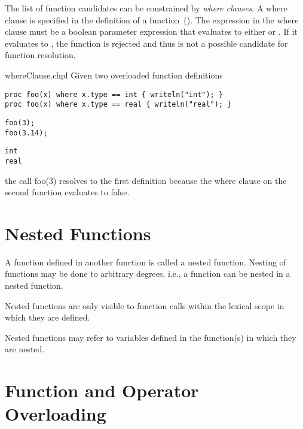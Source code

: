 The list of function candidates can be constrained by {\em where clauses}.  A
where clause is specified in the definition of a
function~().  The expression in the where clause
must be a boolean parameter expression that evaluates to either  or
. If it evaluates to , the function is rejected and
thus is not a possible candidate for function resolution.

\begin{chapelexample}{whereClause.chpl}
Given two overloaded function definitions
\begin{chapel}
\begin{verbatim}
proc foo(x) where x.type == int { writeln("int"); }
proc foo(x) where x.type == real { writeln("real"); }
\end{verbatim}
\end{chapel}
\begin{chapelpost}
\begin{verbatim}
foo(3);
foo(3.14);
\end{verbatim}
\end{chapelpost}
\begin{chapeloutput}
\begin{verbatim}
int
real
\end{verbatim}
\end{chapeloutput}
the call foo(3) resolves to the first definition because the where clause on
the second function evaluates to false.
\end{chapelexample}

\section{Nested Functions}
\label{Nested_Functions}

A function defined in another function is called a nested function.
Nesting of functions may be done to arbitrary degrees, i.e., a
function can be nested in a nested function.

Nested functions are only visible to function calls within the lexical scope
in which they are defined.

Nested functions may refer to variables defined in the function(s) in
which they are nested.


\section{Function and Operator Overloading}
\label{Function_Overloading}

